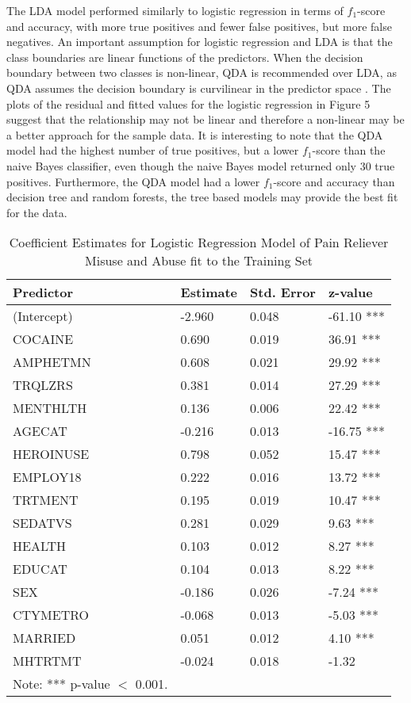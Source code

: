 \documentclass[sigconf]{acmart}
\begin{document}
The LDA model performed similarly to logistic regression in terms of 
$f_1$-score and accuracy, with more true positives and fewer false 
positives, but more false negatives. An important assumption for logistic
regression and LDA is that the class boundaries are linear functions 
of the predictors. When the decision boundary between two classes is 
non-linear, QDA is recommended over LDA, as QDA assumes the decision 
boundary is curvilinear in the predictor space \cite{kuhn13}. The plots 
of the residual and fitted values for the logistic regression in Figure 5
suggest that the relationship may not be linear and therefore a non-linear
may be a better approach for the sample data. It is interesting to note 
that the QDA model had the highest number of true positives, but a lower 
$f_1$-score than the naive Bayes classifier, even though the naive Bayes 
model returned only 30 true positives. Furthermore, the QDA model had a 
lower $f_1$-score and accuracy than decision tree and random forests, 
the tree based models may provide the best fit for the data. 


\begin{table}
  \caption{Coefficient Estimates for Logistic Regression Model 
  of Pain Reliever Misuse and Abuse fit to the Training Set}
  \label{tab:freq}
  \begin{tabular}{llll}
    \toprule
    Predictor&  Estimate& Std. Error& z-value  \\    
    \midrule
    (Intercept)& -2.960 &   0.048 & -61.10 ***  \\
    COCAINE  &    0.690 &   0.019 &  36.91 ***  \\
    AMPHETMN &    0.608 &   0.021 &  29.92 ***  \\
    TRQLZRS  &    0.381 &   0.014 &  27.29 ***  \\
    MENTHLTH &    0.136 &   0.006 &  22.42 ***  \\
    AGECAT   &   -0.216 &   0.013 & -16.75 ***  \\
    HEROINUSE&    0.798 &   0.052 &  15.47 ***  \\  
    EMPLOY18 &    0.222 &   0.016 &  13.72 ***  \\
    TRTMENT  &    0.195 &   0.019 &  10.47 ***  \\
    SEDATVS  &    0.281 &   0.029 &   9.63 ***  \\   
    HEALTH   &    0.103 &   0.012 &   8.27 ***  \\
    EDUCAT   &    0.104 &   0.013 &   8.22 ***  \\   
    SEX      &   -0.186 &   0.026 &  -7.24 ***  \\
    CTYMETRO &   -0.068 &   0.013 &  -5.03 ***  \\
    MARRIED  &    0.051 &   0.012 &   4.10 ***  \\
    MHTRTMT  &   -0.024 &   0.018 &  -1.32     \\
    \bottomrule
    Note: *** p-value $<$ 0.001. &  &  
  \end{tabular}
\end{table}
\end{document}

